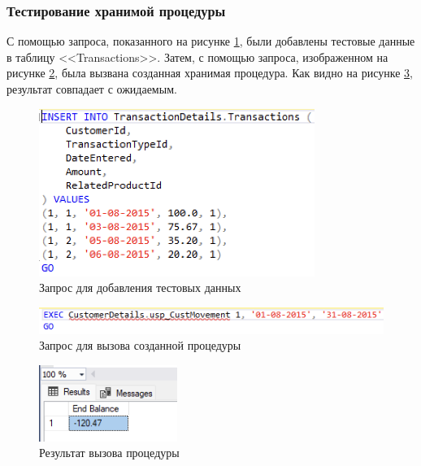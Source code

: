 \documentclass[a4paper, 14pt]{extarticle}
\begin{document}
\subsubsection{Тестирование хранимой процедуры}

С помощью запроса, показанного на рисунке \ref{fig:task-2-3}, были добавлены
тестовые данные в таблицу <<\foreignlanguage{english}{Transactions}>>. Затем, с
помощью запроса, изображенном на рисунке \ref{fig:task-2-4}, была вызвана
созданная хранимая процедура. Как видно на рисунке \ref{fig:task-2-5},
результат совпадает с ожидаемым.

\begin{figure}[H]
  \centering
  \includegraphics[width=0.8\textwidth]{images/task-2/3.png}
  \caption{Запрос для добавления тестовых данных}
  \label{fig:task-2-3}
\end{figure}

\begin{figure}[H]
  \centering
  \includegraphics[width=\textwidth]{images/task-2/4.png}
  \caption{Запрос для вызова созданной процедуры}
  \label{fig:task-2-4}
\end{figure}

\begin{figure}[H]
  \centering
  \includegraphics[width=0.4\textwidth]{images/task-2/5.png}
  \caption{Результат вызова процедуры}
  \label{fig:task-2-5}
\end{figure}
\end{document}
